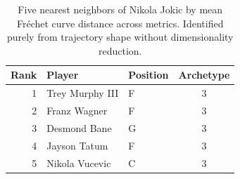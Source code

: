 \begin{table}[htbp]
  \centering\small
  \begin{tabular}{rllc}
    \toprule
    Rank & Player & Position & Archetype \\
    \midrule
    1 & Trey Murphy III & F & 3 \\
    2 & Franz Wagner & F & 3 \\
    3 & Desmond Bane & G & 3 \\
    4 & Jayson Tatum & F & 3 \\
    5 & Nikola Vucevic & C & 3 \\
    \bottomrule
  \end{tabular}
  \caption{Five nearest neighbors of Nikola Jokic by mean Fr\'{e}chet curve distance across metrics. Identified purely from trajectory shape without dimensionality reduction.}
  \label{tab:Nikola_Jokic_frechet_curve_neighbors}
\end{table}

